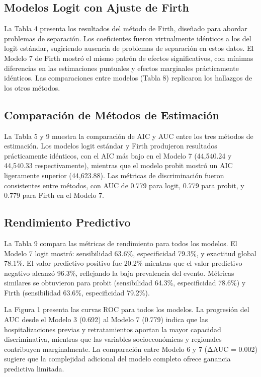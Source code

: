 \documentclass[
  spanish,
  10pt,
]{article}
\begin{document}
\subsection{Modelos Logit con Ajuste de
Firth}\label{modelos-logit-con-ajuste-de-firth}

La Tabla 4 presenta los resultados del método de Firth, diseñado para
abordar problemas de separación. Los coeficientes fueron virtualmente
idénticos a los del logit estándar, sugiriendo ausencia de problemas de
separación en estos datos. El Modelo 7 de Firth mostró el mismo patrón
de efectos significativos, con mínimas diferencias en las estimaciones
puntuales y efectos marginales prácticamente idénticos. Las
comparaciones entre modelos (Tabla 8) replicaron los hallazgos de los
otros métodos.

\subsection{Comparación de Métodos de
Estimación}\label{comparaciuxf3n-de-muxe9todos-de-estimaciuxf3n}

La Tabla 5 y 9 muestra la comparación de AIC y AUC entre los tres
métodos de estimación. Los modelos logit estándar y Firth produjeron
resultados prácticamente idénticos, con el AIC más bajo en el Modelo 7
(44,540.24 y 44,540.33 respectivamente), mientras que el modelo probit
mostró un AIC ligeramente superior (44,623.88). Las métricas de
discriminación fueron consistentes entre métodos, con AUC de 0.779 para
logit, 0.779 para probit, y 0.779 para Firth en el Modelo 7.

\subsection{Rendimiento Predictivo}\label{rendimiento-predictivo}

La Tabla 9 compara las métricas de rendimiento para todos los modelos.
El Modelo 7 logit mostró: sensibilidad 63.6\%, especificidad 79.3\%, y
exactitud global 78.1\%. El valor predictivo positivo fue 20.2\%
mientras que el valor predictivo negativo alcanzó 96.3\%, reflejando la
baja prevalencia del evento. Métricas similares se obtuvieron para
probit (sensibilidad 64.3\%, especificidad 78.6\%) y Firth (sensibilidad
63.6\%, especificidad 79.2\%).

La Figura 1 presenta las curvas ROC para todos los modelos. La
progresión del AUC desde el Modelo 3 (0.692) al Modelo 7 (0.779) indica
que las hospitalizaciones previas y retratamientos aportan la mayor
capacidad discriminativa, mientras que las variables socioeconómicas y
regionales contribuyen marginalmente. La comparación entre Modelo 6 y 7
(ΔAUC = 0.002) sugiere que la complejidad adicional del modelo completo
ofrece ganancia predictiva limitada.
\end{document}
